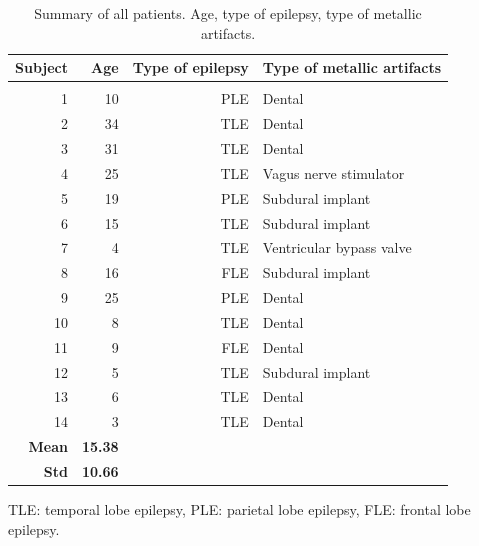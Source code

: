 \begin{table}[h!]
\centering
\caption{Summary of all patients. Age, type of epilepsy, type of metallic artifacts.}
\small
\vspace{3mm}
\label{tb:2-1}
\begin{threeparttable}
\begin{tabular}{rrrl}
Subject       & Age            & Type of epilepsy & Type of metallic artifacts \\ \hline
              &                &                  &                            \\
1             & 10             & PLE              & Dental                     \\
2             & 34             & TLE              & Dental                     \\
3             & 31             & TLE              & Dental                     \\
4             & 25             & TLE              & Vagus nerve stimulator     \\
5             & 19             & PLE              & Subdural implant           \\
6             & 15             & TLE              & Subdural implant           \\
7             & 4              & TLE              & Ventricular bypass valve   \\
8             & 16             & FLE              & Subdural implant           \\
9             & 25             & PLE              & Dental                     \\
10            & 8              & TLE              & Dental                     \\
11            & 9              & FLE              & Dental                     \\
12            & 5              & TLE              & Subdural implant           \\
13            & 6              & TLE              & Dental                     \\
14            & 3              & TLE              & Dental                     \\
\textbf{Mean} & \textbf{15.38} &                  &                            \\
\textbf{Std}  & \textbf{10.66} &                  &                           
\end{tabular}
\begin{tablenotes}
      \small
      \item \begin{flushright} TLE: temporal lobe epilepsy, PLE: parietal lobe epilepsy, FLE: frontal lobe epilepsy.
     \end{flushright}
    \end{tablenotes}
    \end{threeparttable}
\end{table}

